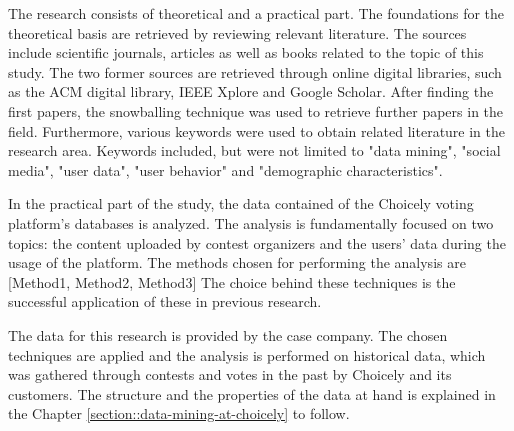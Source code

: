 The research consists of theoretical and a practical part. The foundations for the theoretical basis are retrieved by reviewing relevant literature. The sources include scientific journals, articles as well as books related to the topic of this study. The two former sources are retrieved through online digital libraries, such as the ACM digital library, IEEE Xplore and Google Scholar. After finding the first papers, the snowballing technique was used to retrieve further papers in the field. Furthermore, various keywords were used to obtain related literature in the research area. Keywords included, but were not limited to "data mining", "social media", "user data", "user behavior" and "demographic characteristics". 

In the practical part of the study, the data contained of the Choicely voting platform's databases is analyzed. The analysis is fundamentally focused on two topics: the content uploaded by contest organizers and the users' data during the usage of the platform. The methods chosen for performing the analysis are [Method1, Method2, Method3] %
The choice behind these techniques is the successful application of these in previous research. 

The data for this research is provided by the case company. The chosen techniques are applied and the analysis is performed on historical data, which was gathered through contests and votes in the past by Choicely and its customers. The structure and the properties of the data at hand is explained in the Chapter \ref{section::data-mining-at-choicely} to follow.


